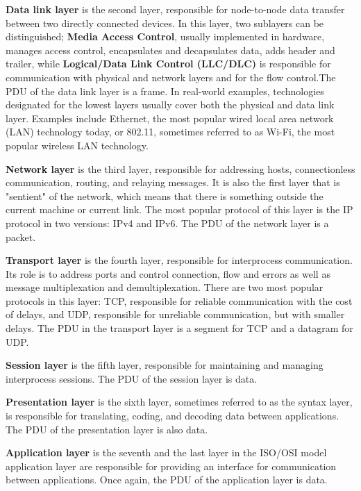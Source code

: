 \textbf{Data link layer} is the second layer, responsible for node-to-node data transfer between two directly connected devices. In this layer, two sublayers can be distinguished; \textbf{Media Access Control}, usually implemented in hardware, manages access control, encapsulates and decapsulates data, adds header and trailer, while \textbf{Logical/Data Link Control (LLC/DLC)} is responsible for communication with physical and network layers and for the flow control.The PDU of the data link layer is a frame.
In real-world examples, technologies designated for the lowest layers usually cover both the physical and data link layer. Examples include Ethernet, the most popular wired local area network (LAN) technology today, or 802.11, sometimes referred to as Wi-Fi, the most popular wireless LAN technology.

\textbf{Network layer} is the third layer, responsible for addressing hosts, connectionless communication, routing, and relaying messages. It is also the first layer that is "sentient" of the network, which means that there is something outside the current machine or current link. The most popular protocol of this layer is the IP protocol in two versions: IPv4 and IPv6. The PDU of the network layer is a packet.

\textbf{Transport layer} is the fourth layer, responsible for interprocess communication. Its role is to address ports and control connection, flow and errors as well as message multiplexation and demultiplexation. There are two most popular protocols in this layer: TCP, responsible for reliable communication with the cost of delays, and UDP, responsible for unreliable communication, but with smaller delays. The PDU in the transport layer is a segment for TCP and a datagram for UDP.

\textbf{Session layer} is the fifth layer, responsible for maintaining and managing interprocess sessions. The PDU of the session layer is data. 

\textbf{Presentation layer} is the sixth layer, sometimes referred to as the syntax layer, is responsible for translating, coding, and decoding data between applications. The PDU of the presentation layer is also data.

\textbf{Application layer} is the seventh and the last layer in the ISO/OSI model application layer are responsible for providing an interface for communication between applications. Once again, the PDU of the application layer is data.


